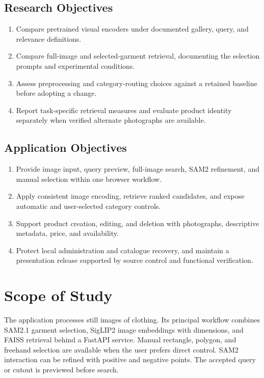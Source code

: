 \subsection{Research Objectives}
\begin{enumerate}[leftmargin=1.8em,itemsep=0.35em]
  \item Compare pretrained visual encoders under documented gallery, query, and
    relevance definitions.
  \item Compare full-image and selected-garment retrieval, documenting the
    selection prompts and experimental conditions.
  \item Assess preprocessing and category-routing choices against a retained
    baseline before adopting a change.
  \item Report task-specific retrieval measures and evaluate product identity
    separately when verified alternate photographs are available.
\end{enumerate}

\subsection{Application Objectives}
\begin{enumerate}[leftmargin=1.8em,itemsep=0.35em]
  \item Provide image input, query preview, full-image search, SAM2 refinement,
    and manual selection within one browser workflow.
  \item Apply consistent image encoding, retrieve ranked candidates, and expose
    automatic and user-selected category controls.
  \item Support product creation, editing, and deletion with photographs,
    descriptive metadata, price, and availability.
  \item Protect local administration and catalogue recovery, and maintain a
    presentation release supported by source control and functional verification.
\end{enumerate}

\section{Scope of Study}
\label{sec:scope}

The application processes still images of clothing. Its principal workflow
combines SAM2.1 garment selection, SigLIP2 image embeddings with
\EmbeddingDimensions{} dimensions, and FAISS retrieval behind a FastAPI service.
Manual rectangle, polygon, and freehand selection are available when the user
prefers direct control. SAM2 interaction can be refined with positive and negative
points. The accepted query or cutout is previewed before search.

